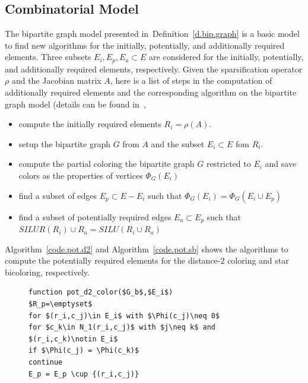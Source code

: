 \documentclass[11pt, twoside,a4paper]{book}
\newcommand{\defref}[1]{Definition~\protect\ref{#1}}
\newcommand{\coderef}[1]{Algorithm~\protect\ref{#1}}
\begin{document}
\subsection{Combinatorial Model}
\label{ss.comb.precond}
The bipartite graph model presented in~\defref{d.bip.graph} is
a basic model to find new algorithms for the initially, potentially,
and additionally required elements. Three subsets $E_i, E_p, E_a\subset E$
are considered for the initially, potentially,
and additionally required elements, respectively.
Given the sparsification operator $\rho$ and the Jacobian matrix $A$,
here is a list of steps in the computation of additionally required elements
and the corresponding algorithm on the bipartite graph model
(details can be found in~\cite{Lulfesmann2012Fap},
\begin{itemize}
\item compute the initially required elements $R_i = \rho(A)$.
\item setup the bipartite graph $G$ from $A$ and the subset $E_i\subset E$ fom $R_i$.
\item compute the partial coloring the bipartite graph $G$ restricted to $E_i$
and save colors as the properties of vertices $\Phi_{G}(E_i)$
\item find a subset of edges $E_p\subset E - E_i$ such that $\Phi_{G}(E_i) = \Phi_{G}(E_i \cup E_p)$
\item find a subset of potentially required edges $E_a\subset E_p$ such
that $SILUR(R_i) \cup R_a = SILU(R_i \cup R_a)$
\end{itemize}
\coderef{code.pot.d2} and \coderef{code.pot.sb} shows the algorithms to compute the
potentially required elements for the distance-$2$ coloring and star bicoloring, respectively.
\begin{figure}
\begin{lstlisting}[caption=Find potentially required elements for
distance-$2$ coloring,label=code.pot.d2,mathescape]
function pot_d2_color($G_b$,$E_i$)
$R_p=\emptyset$
for $(r_i,c_j)\in E_i$ with $\Phi(c_j)\neq 0$
for $c_k\in N_1(r_i,c_j)$ with $j\neq k$ and $(r_i,c_k)\notin E_i$
if $\Phi(c_j) = \Phi(c_k)$
continue
E_p = E_p \cup {(r_i,c_j)}
\end{lstlisting}
\end{figure}
\end{document}
